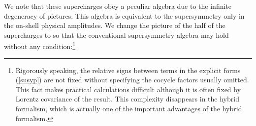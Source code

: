 \documentclass[a4paper,seceq,preprint]{ptptex}
\begin{document}
We note that these supercharges obey a peculiar algebra
due to the infinite degeneracy of pictures. This algebra is 
equivalent to the supersymmetry only in the on-shell physical 
amplitudes. We change the picture of the half of the 
supercharges 
\coordHE{} to 
\coordHE{} so that the conventional supersymmetry algebra
may hold without any condition:\footnote{
Rigorously speaking, the relative signs between terms in the explicit 
forms (\ref{susyp}) are not fixed without specifying the cocycle factors 
usually omitted. This fact makes practical calculations difficult
although it is often fixed by Lorentz covariance of the result. This
complexity disappears in the hybrid formalism, which is
actually one of the important advantages of the hybrid formalism.}
\end{document}
